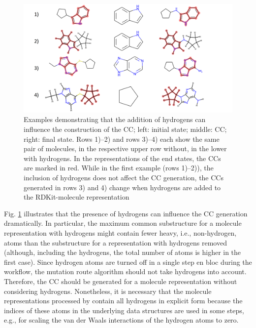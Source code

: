 \begin{figure}
	
	\includegraphics[scale=0.13]{hydrogens_plus_minus_v2.png}
	\caption{Examples demonstrating that the addition of hydrogens can influence the construction of the CC; left: initial state; middle: CC; right: final state. Rows 1)--2) and rows 3)--4) each show the same pair of molecules, in the respective upper row without,
		in the lower with hydrogens. In the representations of the end states, the CCs are marked in red. While in the first example (rows 1)--2)), the inclusion of hydrogens does not affect the CC generation, the CCs generated in rows 3) and 4)  change when hydrogens are added to the RDKit-molecule
		representation}
		\label{fig:hydrogen_effect}
\end{figure}

Fig. \ref{fig:hydrogen_effect} illustrates that the presence of hydrogens can influence the CC generation dramatically. In particular, the maximum common substructure for a molecule representation with hydrogens might contain fewer heavy, i.e., non-hydrogen, atoms than the substructure for a representation with hydrogens removed (although, including the hydrogens, the total number of atoms is higher in the first case). 
Since hydrogen atoms are turned off in a single step en bloc during the {\trafo} workflow, the mutation route algorithm should not take hydrogens into account. Therefore, the CC should be generated for a molecule representation without considering hydrogens.
Nonetheless, it is necessary that the molecule representations processed by \trafo contain all hydrogens in explicit form because the indices of these atoms in the underlying data structures are used in some steps, e.g., for scaling the van der Waals interactions of the hydrogen atoms to zero.

